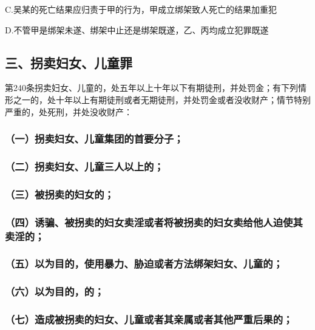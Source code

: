 C.吴某的死亡结果应归责于甲的行为，甲成立绑架致人死亡的结果加重犯

D.不管甲是绑架未遂、绑架中止还是绑架既遂，乙、丙均成立犯罪既遂

\subsection*{三、拐卖妇女、儿童罪}

第240条拐卖妇女、儿童的，处五年以上十年以下有期徒刑，并处罚金；有下列情形之一的，处十年以上有期徒刑或者无期徒刑，并处罚金或者没收财产；情节特别严重的，处死刑，并处没收财产：

\subsubsection*{（一）拐卖妇女、儿童集团的首要分子；}

\subsubsection*{（二）拐卖妇女、儿童三人以上的；}

\subsubsection*{（三）被拐卖的妇女的；}

\subsubsection*{（四）诱骗、被拐卖的妇女卖淫或者将被拐卖的妇女卖给他人迫使其卖淫的；}

\subsubsection*{（五）以为目的，使用暴力、胁迫或者方法绑架妇女、儿童的；}

\subsubsection*{（六）以为目的，的；}

\subsubsection*{（七）造成被拐卖的妇女、儿童或者其亲属或者其他严重后果的；}


